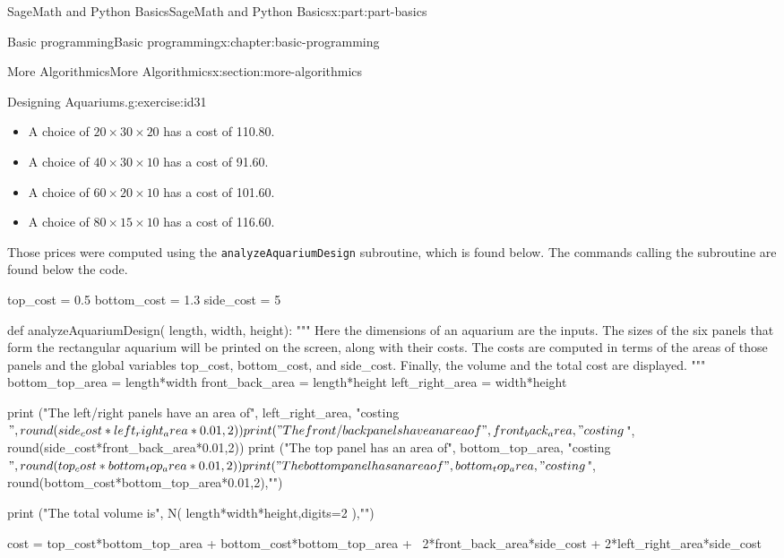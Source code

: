 \documentclass[oneside,10pt,]{book}
\newcommand{\mono}[1]{\texttt{#1}}
\numberwithin{equation}{section}
\begin{document}
\begin{partptx}{SageMath and Python Basics}{}{SageMath and Python Basics}{}{}{x:part:part-basics}
\begin{chapterptx}{Basic programming}{}{Basic programming}{}{}{x:chapter:basic-programming}
\begin{sectionptx}{More Algorithmics}{}{More Algorithmics}{}{}{x:section:more-algorithmics}
\begin{inlineexercise}{Designing Aquariums.}{g:exercise:id31}
%
\begin{itemize}[label=\textbullet]
\item{}A choice of \(20\times 30\times 20\) has a cost of \textdollar{}110.80.%
\item{}A choice of \(40\times 30\times 10\) has a cost of \textdollar{}91.60.%
\item{}A choice of \(60\times 20\times 10\) has a cost of \textdollar{}101.60.%
\item{}A choice of \(80\times 15\times 10\) has a cost of \textdollar{}116.60.%
\end{itemize}
Those prices were computed using the \mono{analyzeAquariumDesign} subroutine, which is found below. The commands calling the subroutine are found below the code.%
\begin{sageinput}
top_cost = 0.5
bottom_cost = 1.3
side_cost = 5

def analyzeAquariumDesign( length, width, height):
    """
    Here the dimensions of an aquarium are the inputs. The
    sizes of the six panels that form the rectangular aquarium
    will be printed on the screen, along with their costs. The
    costs are computed in terms of the areas of those panels and 
    the global variables top_cost, bottom_cost, and side_cost.
    Finally, the volume and the total cost are displayed.
    """
    bottom_top_area = length*width
    front_back_area = length*height
    left_right_area = width*height
    
    print ("The left/right panels have an area of", left_right_area,
           "costing $", round(side_cost*left_right_area*0.01,2))
    print ("The front/back panels have an area of", front_back_area,
           "costing $", round(side_cost*front_back_area*0.01,2))
    print ("The top panel has an area of", bottom_top_area,
           "costing $", round(top_cost*bottom_top_area*0.01,2))
    print ("The bottom panel has an area of", bottom_top_area, 
           "costing $", round(bottom_cost*bottom_top_area*0.01,2),"\n")
    
    print ("The total volume is", N( length*width*height,digits=2 ),"\n")
    
    cost = top_cost*bottom_top_area + bottom_cost*bottom_top_area + \
    2*front_back_area*side_cost + 2*left_right_area*side_cost
    

\end{sageinput}
\end{inlineexercise}
\end{sectionptx}
\end{chapterptx}
\end{partptx}
\end{document}
